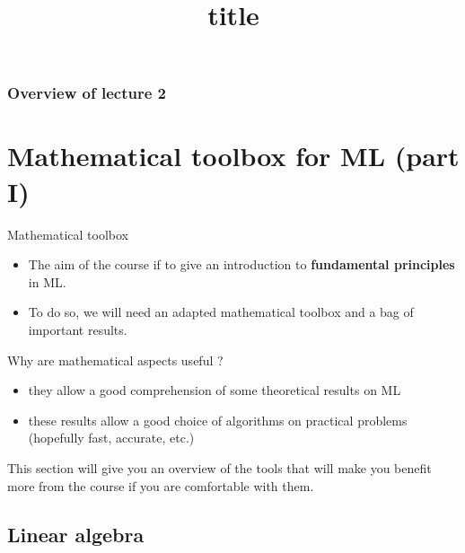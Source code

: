 \documentclass[usenames,dvipsnames]{beamer}
\title[FTML]{title}
\date{} %
\begin{document}
\begin{frame}
\titlepage %
\end{frame}

\begin{frame}
\frametitle{Overview of lecture 2} %
\tableofcontents %
\end{frame}

\section{Mathematical toolbox for ML (part I)}%
\frame{\tableofcontents[currentsection]}
\label{sec:mathematical_tools_for_ml}

\begin{frame}{Mathematical toolbox}
    \begin{itemize}
        \item The aim of the course if to give an introduction to \textbf{{fundamental principles}} in ML.
	\item To do so, we will need an adapted mathematical toolbox and a bag of important results.
    \end{itemize}

    Why are mathematical aspects useful ? 
    \begin{itemize}
    	\item they allow a good comprehension of some theoretical results on ML
	\item these results allow a good choice of algorithms on practical problems (hopefully fast, accurate, etc.)
    \end{itemize}
    This section will give you an overview of the tools that will make you benefit more from the course if you are comfortable with them.
\end{frame}

\subsection{Linear algebra}%
\label{sub:linear_algebra}
\end{document}
